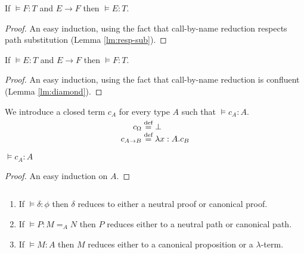 \documentclass[a4paper,UKenglish]{lipics-v2016}
\newcommand*{\eqdef}{\mathrel{\smash{\stackrel{\text{def}}{=}}}}
\theoremstyle{plain}
\theoremstyle{definition}
\begin{document}
\begin{lemma}[Expansion]
\label{lm:expansion}
If $\models F : T$ and $E \rightarrow F$ then $\models E : T$.
\end{lemma}

\begin{proof}
An easy induction, using the fact that call-by-name reduction respects path substitution (Lemma \ref{lm:resp-sub}).
\end{proof}

\begin{lemma}[Reduction]
\label{lm:reduction}
If $\models E : T$ and $E \rightarrow F$ then $\models F : T$.
\end{lemma}

\begin{proof}
An easy induction, using the fact that call-by-name reduction is confluent (Lemma \ref{lm:diamond}).
\end{proof}

\begin{definition}
We introduce a closed term $c_A$ for every type $A$ such that $\models c_A : A$.
\begin{align*}
c_\Omega & \eqdef \bot \\
c_{A \rightarrow B} & \eqdef \lambda x:A.c_B
\end{align*}
\end{definition}

\begin{lemma}
$\models c_A : A$
\end{lemma}

\begin{proof}
An easy induction on $A$.
\end{proof}

\begin{lemma}
\label{lm:neutral-canon}
$ $
\begin{enumerate}
\item
If $\models \delta : \phi$ then $\delta$ reduces to either a neutral proof or canonical proof.
\item
If $\models P : M =_A N$ then $P$ reduces either to a neutral path or canonical path.
\item
If $\models M : A$ then $M$ reduces either to a canonical proposition or a $\lambda$-term.
\end{enumerate}
\end{lemma}
\end{document}
